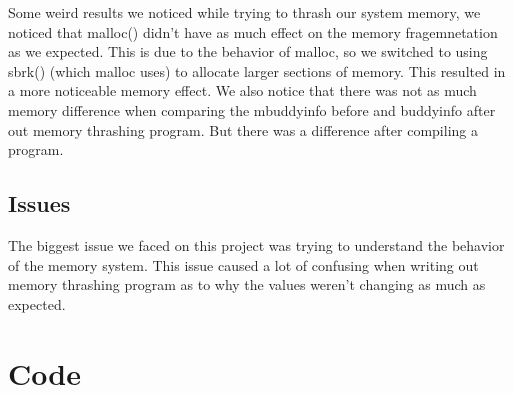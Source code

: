 \documentclass[letterpaper,10pt,titlepage]{article}
\begin{document}
Some weird results we noticed while trying to thrash our system memory, we noticed that malloc() didn't have as much effect on the memory fragemnetation as we expected. This is due to the behavior of malloc, so we switched to using sbrk() (which malloc uses) to allocate larger sections of memory. This resulted in a more noticeable memory effect. We also notice that there was not as much memory difference when comparing the mbuddyinfo before and buddyinfo after out memory thrashing program. But there was a difference after compiling a program.

\subsection*{Issues}

The biggest issue we faced on this project was trying to understand the behavior of the memory system. This issue caused a lot of confusing when writing out memory thrashing program as to why the values weren't changing as much as expected.

\section{Code}
\label{Implementation Specific Code}


\end{document}
